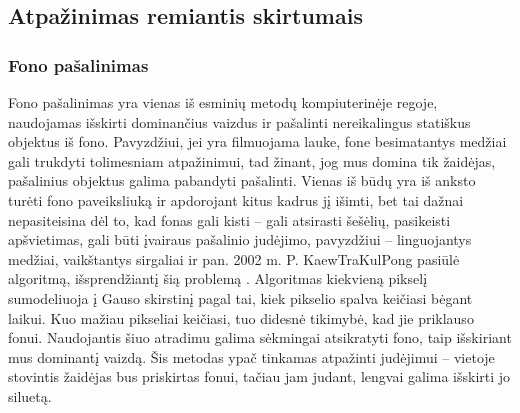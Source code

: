 \documentclass{VUMIFPSbakalaurinis}
\begin{document}
\subsection{Atpažinimas remiantis skirtumais}
\subsubsection{Fono pašalinimas}
Fono pašalinimas yra vienas iš esminių metodų kompiuterinėje regoje, naudojamas išskirti dominančius vaizdus ir pašalinti nereikalingus statiškus objektus iš fono. Pavyzdžiui, jei yra filmuojama lauke, fone besimatantys medžiai gali trukdyti tolimesniam atpažinimui, tad žinant, jog mus domina tik žaidėjas, pašalinius objektus galima pabandyti pašalinti. Vienas iš būdų yra iš anksto turėti fono paveiksliuką ir apdorojant kitus kadrus jį išimti, bet tai dažnai nepasiteisina dėl to, kad fonas gali kisti – gali atsirasti šešėlių, pasikeisti apšvietimas, gali būti įvairaus pašalinio judėjimo, pavyzdžiui – linguojantys medžiai, vaikštantys sirgaliai ir pan. 2002 m.  P. KaewTraKulPong pasiūlė algoritmą, išsprendžiantį šią problemą \cite{KaewTraKulPong2002}. Algoritmas kiekvieną pikselį sumodeliuoja į Gauso skirstinį pagal tai, kiek pikselio spalva keičiasi bėgant laikui. Kuo mažiau pikseliai keičiasi, tuo didesnė tikimybė, kad jie priklauso fonui. Naudojantis šiuo atradimu galima sėkmingai atsikratyti fono, taip išskiriant mus dominantį vaizdą. Šis metodas ypač tinkamas atpažinti judėjimui – vietoje stovintis žaidėjas bus priskirtas fonui, tačiau jam judant, lengvai galima išskirti jo siluetą.  
\end{document}
